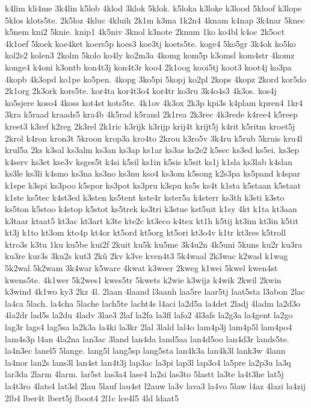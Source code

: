 {k4lim
kli4me
3k4lin
k5lob
4klod
3klok
5klok.
k5loka
k3loke
k3lood
5kloof
k3lope
5klos
klots5te.
2k5loz
4kluc
4kluih
2k1m
k3ma
1k2n4
4knam
k4nap
3k4nar
5knec
k5nem
kni2
5knie.
knip1
4k5niv
3knol
k3note
2knum
1ko
ko4bl
k4oc
2k5oct
4k1oef
5koek
koe4ket
koers5p
koes3
koe3tj
koets5te.
koge4
5ko5gr
3k4ok
ko5ko
kol2e2
kolen3
2kolm
5kolo
ko4ly
ko2m3a
4komg
kom5p
k3omsl
kom4str
4komz
konge4
k4oni
k3ontb
kon4t3j
kon4t3r
koo4
2k1oog
kooi5tj
koot3
koot4j
ko3pa
4kopb
4k3opd
ko1pe
ko5pen.
4kopg
3ko5pi
5kopj
ko2pl
2kops
4kopz
2kord
kor5do
2k1org
2k3ork
kors5te.
kor4ta
kor4t3o4
kor4tr
ko3ru
3k4o4s3
4k3os.
kos4j
ko5sjere
koso4
4koss
kot4st
kots5te.
4k1ov
4k3ox
2k3p
kpi3s
k4plam
kpren4
1kr4
3kra
k5raad
kraads5
kra4b
4k5rad
k5rand
2k1rea
2k3rec
4k3rede
k4ree4
k5reep
kreet3
k3ref
k2reg
2k3rel
2k1ric
k3rijk
k3rijp
krij4t
krijt5j
k4rit
k5ritm
kroet5j
2krol
k4ron
kron3t
5kroon
krop3a
kro4to
2krou
k3ro5v
3k4ru
k5rub
5kruis
kru4l
krul5a
2ks
k3sal
ks3alm
ks3an
ks3ap
ks1ar
ks3as
ks2e2
k5sec
ks3ed
ks5ei.
ks3ep
k4serv
ks3et
kse3v
ksges5t
k4si
k5sil
ks1in
k5sis
k5sit
ks1j
k1sla
ks3lab
k4slan
ks3le
ks3li
k4smo
ks3na
ks3no
ks3nu
kso4
ks3om
k5song
k2s3pa
ks5pand
k4spar
k1spe
k3spi
ks3poo
k5spor
ks3pot
ks3pru
k3spu
ks5s
ks4t
k1sta
k5staan
k5staat
k1ste
ks5tec
k4st3ed
k3sten
ks5tent
kste4r
kster5a
k4sterr
ks3th
k3sti
k3sto
ks5ton
k5stoo
k4stop
k5stot
ks5trek
ks3tri
k3stue
kst5uit
k1sy
4kt
k1ta
kt3aan
k3taar
ktaat5
kt3ac
kt3art
k3te
kte2c
kt3eco
k4tex
kt1h
k5tij
kt3im
kt3in
k5tit
kt3j
k1to
kt3om
kto4p
kt4or
kt5ord
kt5org
kt5ori
kt3o4v
k1tr
kt3res
k5troll
ktro3s
k3tu
1ku
ku5be
kui2f
2kuit
ku5k
ku5me
3k4u2n
4k5uni
5kuns
ku2r
ku3ra
ku3re
kur3s
3ku2s
kut3
2kû
2kv
k3ve
kven4t3
5k4waal
2k3wac
k2wad
k1wag
5k2wal
5k2wam
3k4war
k5ware
4kwat
k3weer
2kweg
k1wei
5kwel
kwen4st
kwens5te.
4k1wer
5k2wes1
kwes5tr
5kwets
k2wie
k3wijz
k4wik
2kwil
2kwin
k3wind
4k1wo
ky3
2kz
4l.
2laan
4laand
l3aanh
laa5re
laar5tj
laat5sta
l3abon
2lac
la4ca
5lach.
la4cha
5lache
lach5te
lacht4s
l4aci
la2d5a
la4det
2ladj
4ladm
la2d3o
4la2dr
lad5s
la2du
4ladv
3lae3
2laf
la2fa
la3fl
lafo2
4l3afs
la2g3a
la4gent
la2go
lag3r
lags4
lag5sa
la2k3a
la4ki
la3kr
2lal
3lald
lal4o
lam4p3j
lam4p5l
lam4po4
lam4s3p
l4an
4la2na
lan3ac
3land
lan4da
land5aa
lan4d5oo
lan4d3r
lands5te.
la4n3ec
lanel5
5lange.
lang5l
lang5sp
lang5sta
lan4k3a
lan4k3l
lank3w
4lann
la4nor
lan2s
lans3l
lan4st
lan4t3j
lap3ac
la3pi
lap3l
lap3o4
la5pre
la2p3u
la3q
lar3da
2larm
4larm.
lar5st
las3a4
lase4
la2si
las3to
5lastt
la3te
la4t3he
lat5j
la4t3ro
4lats4
lat3sl
2lau
5lauf
lau4st
l2auw
la3v
lava3
la4vo
5law
l4az
4lazi
la4zij
2lb4
lber4t
lbert5j
lboot4
2l1c
lce4l5
4ld
ldaat5
}
